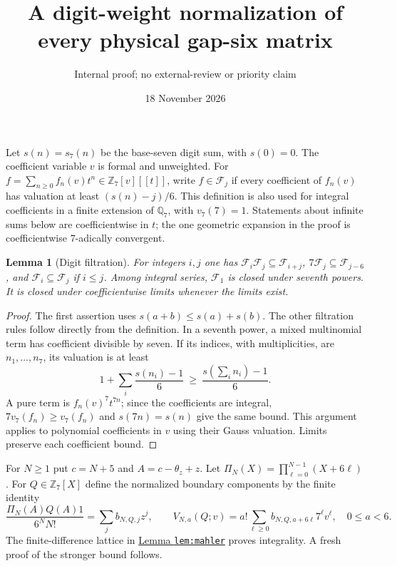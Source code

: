 \documentclass[11pt]{article}
\title{A digit-weight normalization of every physical gap-six matrix}
\author{Internal proof; no external-review or priority claim}\date{18 November 2026}
\newtheorem{lemma}{Lemma}\newtheorem{theorem}[lemma]{Theorem}\newtheorem{corollary}[lemma]{Corollary}\newtheorem{proposition}[lemma]{Proposition}
\begin{document}
\maketitle
Let $s(n)=s_7(n)$ be the base-seven digit sum, with $s(0)=0$.
The coefficient variable $v$ is formal and unweighted.
For $f=\sum_{n\ge0}f_n(v)t^n\in\mathbb Z_7[v][[t]]$,
write $f\in\mathcal F_j$ if every coefficient of $f_n(v)$
has valuation at least $(s(n)-j)/6$.
This definition is also used for integral coefficients in a finite
extension of $\mathbb Q_7$, with $v_7(7)=1$.
Statements about infinite sums below are coefficientwise in $t$;
the one geometric expansion in the proof is coefficientwise
$7$-adically convergent.

\begin{lemma}[Digit filtration]\label{lem:filtration}
For integers $i,j$ one has
$\mathcal F_i\mathcal F_j\subseteq\mathcal F_{i+j}$,
$7\mathcal F_j\subseteq\mathcal F_{j-6}$, and
$\mathcal F_i\subseteq\mathcal F_j$ if $i\le j$.
Among integral series, $\mathcal F_1$ is closed under seventh
powers. It is closed under coefficientwise limits whenever the
limits exist.
\end{lemma}
\begin{proof}
The first assertion uses $s(a+b)\le s(a)+s(b)$.
The other filtration rules follow directly from the definition.
In a seventh power, a mixed multinomial term has coefficient
divisible by seven. If its indices, with multiplicities, are
$n_1,\ldots,n_7$, its valuation is at least
\[
 1+\sum_i\frac{s(n_i)-1}{6}
 \ \ge\ \frac{s(\sum_i n_i)-1}{6}.
\]
A pure term is $f_n(v)^7t^{7n}$; since the coefficients are integral,
$7v_7(f_n)\ge v_7(f_n)$ and $s(7n)=s(n)$ give the same bound.
This argument applies to polynomial coefficients in $v$ using
their Gauss valuation. Limits preserve each coefficient bound.
\end{proof}

For $N\ge1$ put $c=N+5$ and $A=c-\theta_z+z$.
Let $\Pi_N(X)=\prod_{\ell=0}^{N-1}(X+6\ell)$.
For $Q\in\mathbb Z_7[X]$ define the normalized boundary components
by the finite identity
\[
 \frac{\Pi_N(A)Q(A)1}{6^NN!}
    =\sum_j b_{N,Q,j}z^j,\qquad
 V_{N,a}(Q;v)=a!\sum_{\ell\ge0}
            b_{N,Q,a+6\ell}7^\ell v^\ell,\quad 0\le a<6.
 \tag{1}
\]
The finite-difference lattice in
\href{GAP_SIX_BOUNDARY_COUPLED_FROBENIUS.tex}
{Lemma \texttt{lem:mahler}}
proves integrality. A fresh proof of the stronger bound follows.
\end{document}
